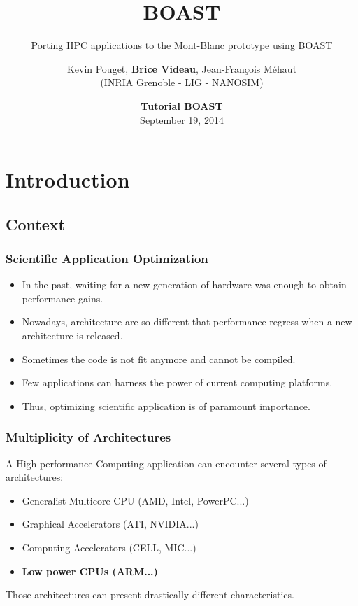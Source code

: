 \documentclass{beamer}
\title{BOAST}
\subtitle{Porting HPC applications to the Mont-Blanc prototype using BOAST }
\author{Kevin Pouget, \textbf{Brice Videau}, Jean-François Méhaut\\
(INRIA Grenoble - LIG - NANOSIM)}
\date{\textbf{Tutorial BOAST}\\September 19, 2014}
\begin{document}
\frame{\titlepage}

\section{Introduction}


\subsection{Context}

\begin{frame}
    \frametitle{Scientific Application Optimization}
\begin{itemize}
\item In the past, waiting for a new generation of hardware was enough to obtain performance gains.
\item Nowadays, architecture are so different that performance regress when a new architecture is released.
\item Sometimes the code is not fit anymore and cannot be compiled.
\item Few applications can harness the power of current computing platforms.
\item Thus, optimizing scientific application is of paramount importance.
\end{itemize}
\end{frame}

\begin{frame}
\frametitle{Multiplicity of Architectures}
A High performance Computing application can encounter several types of architectures:
\begin{itemize}
\item Generalist Multicore CPU (AMD, Intel, PowerPC...)
\item Graphical Accelerators (ATI, NVIDIA...)
\item Computing Accelerators (CELL, MIC...)
\item \textbf{Low power CPUs (ARM...)}
\end{itemize}
Those architectures can present drastically different characteristics.
\end{frame}
\end{document}
